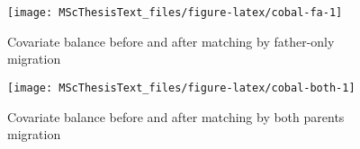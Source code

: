 \documentclass[
  man,floatsintext]{apa7}
\begin{document}
\newpage

\begin{figure}
\texttt{[image: MScThesisText\_files/figure-latex/cobal-fa-1]} \caption{Covariate balance before and after matching by father-only migration}\label{fig:cobal-fa}
\end{figure}

\begin{figure}
\texttt{[image: MScThesisText\_files/figure-latex/cobal-both-1]} \caption{Covariate balance before and after matching by both parents migration}\label{fig:cobal-both}
\end{figure}
\end{document}
